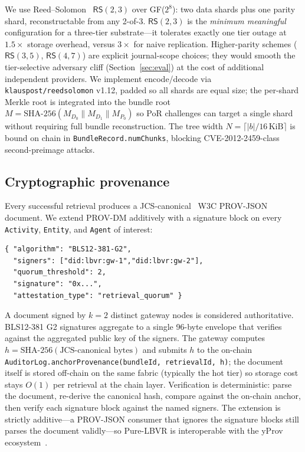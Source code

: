 We use Reed--Solomon~\cite{plank1997erasure} $\textsf{RS}(2,3)$ over GF($2^8$): two data shards plus one parity shard, reconstructable from any 2-of-3. $\textsf{RS}(2,3)$ is the \emph{minimum meaningful} configuration for a three-tier substrate---it tolerates exactly one tier outage at $1.5\times$ storage overhead, versus $3\times$ for naive replication. Higher-parity schemes ($\textsf{RS}(3,5)$, $\textsf{RS}(4,7)$) are explicit journal-scope choices; they would smooth the tier-selective adversary cliff (Section~\ref{sec:eval}) at the cost of additional independent providers. We implement encode/decode via \texttt{klauspost/reedsolomon} v1.12, padded so all shards are equal size; the per-shard Merkle root is integrated into the bundle root $M = \text{SHA-256}(M_{D_0} \mathbin{\|} M_{D_1} \mathbin{\|} M_{P_0})$ so PoR challenges can target a single shard without requiring full bundle reconstruction. The tree width $N = \lceil |b|/16\,\text{KiB} \rceil$ is bound on chain in \texttt{BundleRecord.numChunks}, blocking CVE-2012-2459-class second-preimage attacks.

\subsection{Cryptographic provenance}
\label{sec:method:prov}

Every successful retrieval produces a JCS-canonical~\cite{rfc8785} W3C PROV-JSON~\cite{w3cprov} document. We extend PROV-DM additively with a signature block on every \texttt{Activity}, \texttt{Entity}, and \texttt{Agent} of interest:
\begin{lstlisting}[basicstyle=\ttfamily\scriptsize,frame=single]
{ "algorithm": "BLS12-381-G2",
  "signers": ["did:lbvr:gw-1","did:lbvr:gw-2"],
  "quorum_threshold": 2,
  "signature": "0x...",
  "attestation_type": "retrieval_quorum" }
\end{lstlisting}
A document signed by $k = 2$ distinct gateway nodes is considered authoritative. BLS12-381 G2 signatures aggregate to a single 96-byte envelope that verifies against the aggregated public key of the signers. The gateway computes $h = \text{SHA-256}(\text{JCS-canonical bytes})$ and submits $h$ to the on-chain \texttt{AuditorLog.anchorProvenance(bundleId, retrievalId, h)}; the document itself is stored off-chain on the same fabric (typically the hot tier) so storage cost stays $O(1)$ per retrieval at the chain layer. Verification is deterministic: parse the document, re-derive the canonical hash, compare against the on-chain anchor, then verify each signature block against the named signers. The extension is strictly additive---a PROV-JSON consumer that ignores the signature blocks still parses the document validly---so Pure-LBVR is interoperable with the yProv ecosystem~\cite{manzi2025intertwin}.

